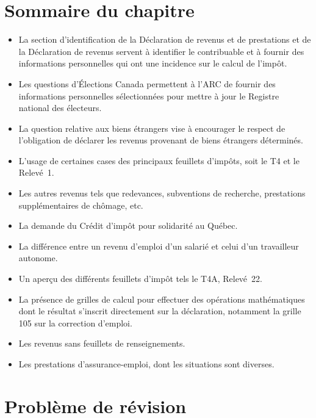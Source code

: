 \section{Sommaire du chapitre}
\begin{itemize}
	\item La section d'identification de la Déclaration de revenus et de prestations et de la Déclaration de revenus servent à identifier le contribuable et à fournir des informations personnelles qui ont une incidence sur le calcul de l'impôt.
	\item Les questions d'Élections Canada permettent à l'ARC de fournir des informations personnelles sélectionnées pour mettre à jour le Registre national des électeurs.
	\item La question relative aux biens étrangers vise à encourager le respect de l'obligation de déclarer les revenus provenant de biens étrangers déterminés.
	\item L'usage de certaines cases des principaux feuillets d'impôts, soit le T4 et le Relevé~1.
	\item Les autres revenus tels que redevances, subventions de recherche, prestations supplémentaires de chômage, etc.
	\item La demande du Crédit d'impôt pour solidarité au Québec.
	\item La différence entre un revenu d'emploi d'un salarié et celui d'un travailleur autonome.
	\item Un aperçu des différents feuillets d'impôt tels le T4A, Relevé~22.
	\item La présence de grilles de calcul pour effectuer des opérations mathématiques dont le résultat s'inscrit directement sur la déclaration, notamment la grille 105 sur la correction d'emploi.
	\item Les revenus sans feuillets de renseignements. 
	\item Les prestations d'assurance-emploi, dont les situations sont diverses.
\end{itemize}



\section{Problème de révision}
